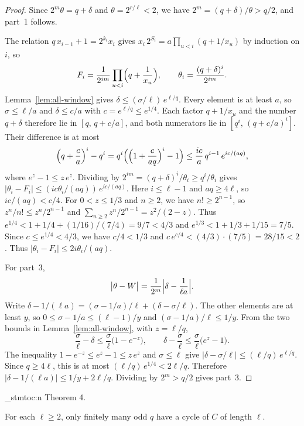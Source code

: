 \documentclass[11pt]{article}
\newenvironment{named}[1]{%
  \par\addvspace{\medskipamount}%
  \pagebreak[3]%
  \noindent{\bfseries #1}\space\ignorespaces
  \stmtoc{#1}%
}{\par\addvspace{\medskipamount}}
\newcommand{\stmtoc}[1]{ \qn_stmtoc:n {#1} }
\newcounter{stmtref}
\newcommand{\markstmt}[2]{%
  \setcounter{stmtref}{#1}%
  \addtocounter{stmtref}{-1}%
  \refstepcounter{stmtref}%
  \label{#2}%
}
\begin{document}
\begin{proof}
Since $2^m \theta = q + \delta$ and $\theta = 2^{r/\ell} < 2$, we have $2^m = (q+\delta)/\theta > q/2$, and part~1 follows.

The relation $q\, x_{i-1} + 1 = 2^{k_i} x_i$ gives $x_i\, 2^{S_i} = a \prod_{u < i}(q + 1/x_u)$ by induction on $i$, so
\[
F_i = \frac{1}{2^{im}}\prod_{u < i}\Bigl(q + \frac{1}{x_u}\Bigr), \qquad \theta_i = \frac{(q+\delta)^i}{2^{im}}.
\]
Lemma~\ref{lem:all-window} gives $\delta \le (\sigma/\ell)\, e^{\ell/q}$.
Every element is at least $a$, so $\sigma \le \ell/a$ and $\delta \le c/a$ with $c = e^{\ell/q} \le e^{1/4}$.
Each factor $q + 1/x_u$ and the number $q+\delta$ therefore lie in $[q,\, q + c/a]$, and both numerators lie in $[q^i,\, (q + c/a)^i]$.
Their difference is at most
\[
\Bigl(q + \frac{c}{a}\Bigr)^i - q^i = q^i\Bigl(\Bigl(1 + \frac{c}{aq}\Bigr)^i - 1\Bigr) \le \frac{ic}{a}\, q^{i-1}\, e^{ic/(aq)},
\]
where $e^z - 1 \le z\, e^z$.
Dividing by $2^{im} = (q+\delta)^i/\theta_i \ge q^i/\theta_i$ gives $\lvert \theta_i - F_i \rvert \le (ic\theta_i/(aq))\, e^{ic/(aq)}$.
Here $i \le \ell - 1$ and $aq \ge 4\ell$, so $ic/(aq) < c/4$.
For $0 < z \le 1/3$ and $n \ge 2$, we have $n! \ge 2^{n-1}$, so $z^n/n! \le z^n/2^{n-1}$ and $\sum_{n \ge 2} z^n/2^{n-1} = z^2/(2-z)$.
Thus $e^{1/4} < 1 + 1/4 + (1/16)/(7/4) = 9/7 < 4/3$ and $e^{1/3} < 1 + 1/3 + 1/15 = 7/5$.
Since $c \le e^{1/4} < 4/3$, we have $c/4 < 1/3$ and $c\, e^{c/4} < (4/3) \cdot (7/5) = 28/15 < 2$.
Thus $\lvert \theta_i - F_i \rvert \le 2i\theta_i/(aq)$.

For part~3,
\[
\bigl\lvert \theta - W \bigr\rvert = \frac{1}{2^m}\Bigl\lvert \delta - \frac{1}{\ell a} \Bigr\rvert.
\]
Write $\delta - 1/(\ell a) = (\sigma - 1/a)/\ell + (\delta - \sigma/\ell)$.
The other elements are at least $y$, so $0 \le \sigma - 1/a \le (\ell-1)/y$ and $(\sigma - 1/a)/\ell \le 1/y$.
From the two bounds in Lemma~\ref{lem:all-window}, with $z = \ell/q$,
\[
\frac{\sigma}{\ell} - \delta \le \frac{\sigma}{\ell}\bigl(1 - e^{-z}\bigr), \qquad \delta - \frac{\sigma}{\ell} \le \frac{\sigma}{\ell}\bigl(e^z - 1\bigr).
\]
The inequality $1 - e^{-z} \le e^z - 1 \le z\, e^z$ and $\sigma \le \ell$ give $\lvert \delta - \sigma/\ell \rvert \le (\ell/q)\, e^{\ell/q}$.
Since $q \ge 4\ell$, this is at most $(\ell/q)\, e^{1/4} < 2\ell/q$.
Therefore $\lvert \delta - 1/(\ell a) \rvert \le 1/y + 2\ell/q$.
Dividing by $2^m > q/2$ gives part~3.
\end{proof}

\begin{named}{Theorem 4.}
\markstmt{4}{thm:all-finite}
For each $\ell \ge 2$, only finitely many odd $q$ have a cycle of $C$ of length $\ell$.
\end{named}
\end{document}
